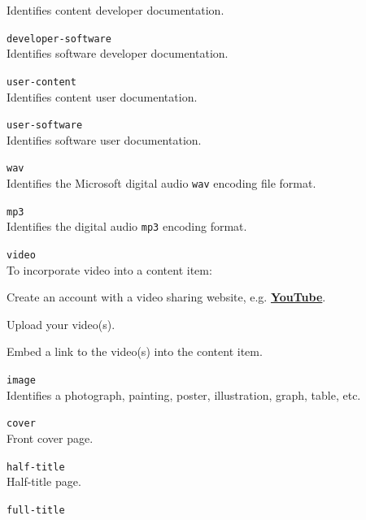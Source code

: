 \documentclass[12pt]{article}
\begin{document}
\begin{description}
\begin{description}
	Identifies content developer documentation.
	\item {\tt developer-software}\\
	Identifies software developer documentation.
	\item {\tt user-content}\\
	Identifies content user documentation.
	\item {\tt user-software}\\
	Identifies software user documentation.
  	\item{\tt wav}\\
	Identifies the Microsoft digital audio {\tt \small wav} encoding file format.
  	 \item{\tt mp3}\\
	 Identifies the digital audio {\tt \small mp3} encoding format.
	\item {\tt video}\\
	To incorporate video into a content item:
		\begin{description}
		\item Create an account with a video sharing website, e.g. \href{http://www.youtube.com/watch?v=1n8DxTk2gVM}{\bf YouTube}.
   		\item Upload your video(s).
  		\item Embed a link to the video(s) into the content item.
		\end{description}
	\item {\tt image}\\
	Identifies a photograph, painting, poster, illustration, graph, table, etc.
	\item {\tt cover}\\
	Front cover page.
	\item {\tt half-title}\\
	Half-title page.
	\item {\tt full-title}\\

\end{description}
\end{description}
\end{document}
